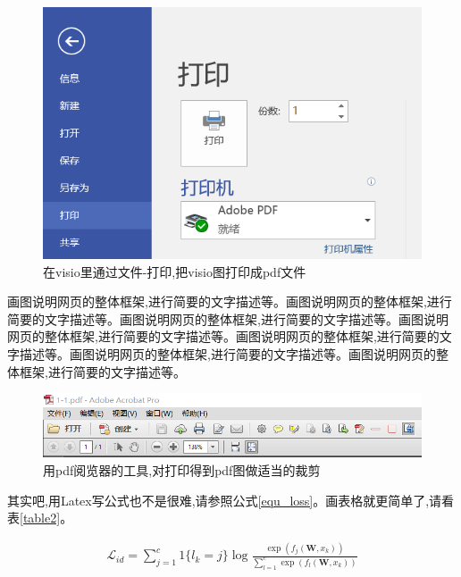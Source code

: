 \documentclass[supercite]{Experimental_Report}
\theoremstyle{definition}
\begin{document}
\begin{figure}[htb]
	\begin{center}
		\includegraphics[scale=0.60]{images/1-2.png}
		\caption{在visio里通过文件-打印,把visio图打印成pdf文件}
		\label{fig1-2}
		\end{center}
\end{figure}

画图说明网页的整体框架,进行简要的文字描述等。画图说明网页的整体框架,进行简要的文字描述等。画图说明网页的整体框架,进行简要的文字描述等。画图说明网页的整体框架,进行简要的文字描述等。画图说明网页的整体框架,进行简要的文字描述等。画图说明网页的整体框架,进行简要的文字描述等。画图说明网页的整体框架,进行简要的文字描述等。

\begin{figure}[htb]
	\begin{center}
		\includegraphics[scale=0.50]{images/1-3.png}
		\caption{用pdf阅览器的工具,对打印得到pdf图做适当的裁剪}
		\label{fig1-3}
	\end{center}
\end{figure}

其实吧,用Latex写公式也不是很难,请参照公式\ref{equ_loss}。画表格就更简单了,请看表\ref{table2}。

\begin{eqnarray}\label{equ_loss}
	\mathcal{L}_{id}=\sum_{j=1}^{c}1\{l_k=j\}\log\frac{\exp(f_j(\textbf{W},x_k))}{\sum\nolimits_{l=1}^{c}\exp(f_l(\textbf{W},x_k))}
\end{eqnarray}
\end{document}
